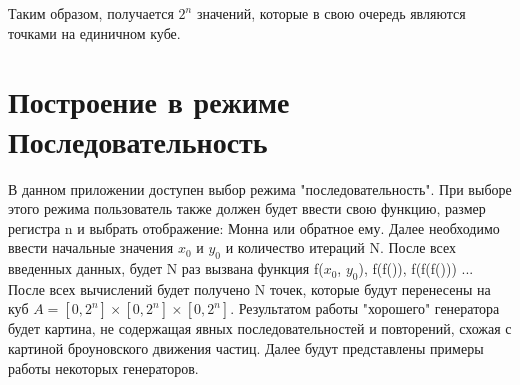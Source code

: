 Таким образом, получается $2^n$ значений, которые в свою очередь являются точками на единичном кубе.

\section{Построение в режиме Последовательность} \label{sect2_3}

В данном приложении доступен выбор режима "последовательность". При выборе этого режима пользователь также должен будет ввести свою функцию, размер регистра n и выбрать отображение: Монна или обратное ему. Далее необходимо ввести начальные значения $x_0$ и $y_0$ и количество итераций N. После всех введенных данных, будет N раз вызвана функция f($x_0$, $y_0$), f(f()), f(f(f())) ...
После всех вычислений будет получено N точек, которые будут перенесены на куб $A=[0,2^n]\times[0,2^n]\times[0,2^n]$. Результатом работы "хорошего" генератора будет картина, не содержащая явных последовательностей и повторений, схожая с картиной броуновского движения частиц.
Далее будут представлены примеры работы некоторых генераторов.
\fi

\clearpage

